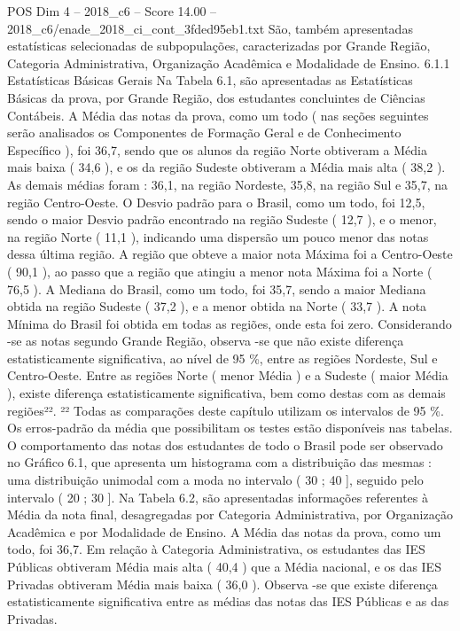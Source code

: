 \begin{textsample}{POS Dim 4 – 2018\_c6 – Score 14.00 – 2018\_c6/enade\_2018\_ci\_cont\_3fded95eb1.txt}
São, também apresentadas estatísticas selecionadas de subpopulações, caracterizadas por Grande Região, Categoria Administrativa, Organização Acadêmica e Modalidade de Ensino. 6.1.1 Estatísticas Básicas Gerais Na Tabela 6.1, são apresentadas as Estatísticas Básicas da prova, por Grande Região, dos estudantes concluintes de Ciências Contábeis.
A Média das notas da prova, como um todo ( nas seções seguintes serão analisados os Componentes de Formação Geral e de Conhecimento Específico ), foi 36,7, sendo que os alunos da região Norte obtiveram a Média mais baixa ( 34,6 ), e os da região Sudeste obtiveram a Média mais alta ( 38,2 ).
As demais médias foram : 36,1, na região Nordeste, 35,8, na região Sul e 35,7, na região Centro-Oeste.
O Desvio padrão para o Brasil, como um todo, foi 12,5, sendo o maior Desvio padrão encontrado na região Sudeste ( 12,7 ), e o menor, na região Norte ( 11,1 ), indicando uma dispersão um pouco menor das notas dessa última região.
A região que obteve a maior nota Máxima foi a Centro-Oeste ( 90,1 ), ao passo que a região que atingiu a menor nota Máxima foi a Norte ( 76,5 ).
A Mediana do Brasil, como um todo, foi 35,7, sendo a maior Mediana obtida na região Sudeste ( 37,2 ), e a menor obtida na Norte ( 33,7 ).
A nota Mínima do Brasil foi obtida em todas as regiões, onde esta foi zero.
Considerando -se as notas segundo Grande Região, observa -se que não existe diferença estatisticamente significativa, ao nível de 95 \%, entre as regiões Nordeste, Sul e Centro-Oeste.
Entre as regiões Norte ( menor Média ) e a Sudeste ( maior Média ), existe diferença estatisticamente significativa, bem como destas com as demais regiões²². ²² Todas as comparações deste capítulo utilizam os intervalos de 95 \%.
Os erros-padrão da média que possibilitam os testes estão disponíveis nas tabelas.
O comportamento das notas dos estudantes de todo o Brasil pode ser observado no Gráfico 6.1, que apresenta um histograma com a distribuição das mesmas : uma distribuição unimodal com a moda no intervalo ( 30 ; 40 ], seguido pelo intervalo ( 20 ; 30 ].
Na Tabela 6.2, são apresentadas informações referentes à Média da nota final, desagregadas por Categoria Administrativa, por Organização Acadêmica e por Modalidade de Ensino.
A Média das notas da prova, como um todo, foi 36,7.
Em relação à Categoria Administrativa, os estudantes das IES Públicas obtiveram Média mais alta ( 40,4 ) que a Média nacional, e os das IES Privadas obtiveram Média mais baixa ( 36,0 ).
Observa -se que existe diferença estatisticamente significativa entre as médias das notas das IES Públicas e as das Privadas.

\end{textsample}
